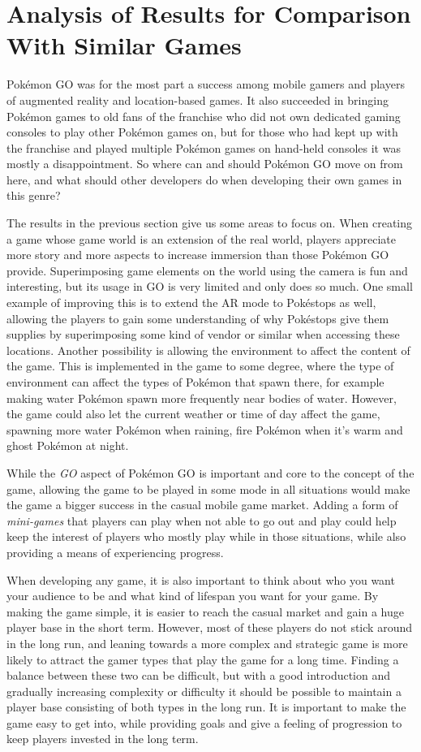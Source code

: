\section{Analysis of Results for Comparison With Similar Games}
Pokémon GO was for the most part a success among mobile gamers and players of augmented reality and location-based games. It also succeeded in bringing Pokémon games to old fans of the franchise who did not own dedicated gaming consoles to play other Pokémon games on, but for those who had kept up with the franchise and played multiple Pokémon games on hand-held consoles it was mostly a disappointment. So where can and should Pokémon GO move on from here, and what should other developers do when developing their own games in this genre?

The results in the previous section give us some areas to focus on. When creating a game whose game world is an extension of the real world, players appreciate more story and more aspects to increase immersion than those Pokémon GO provide. Superimposing game elements on the world using the camera is fun and interesting, but its usage in GO is very limited and only does so much. One small example of improving this is to extend the AR mode to Pokéstops as well, allowing the players to gain some understanding of why Pokéstops give them supplies by superimposing some kind of vendor or similar when accessing these locations. Another possibility is allowing the environment to affect the content of the game. This is implemented in the game to some degree, where the type of environment can affect the types of Pokémon that spawn there, for example making water Pokémon spawn more frequently near bodies of water. However, the game could also let the current weather or time of day affect the game, spawning more water Pokémon when raining, fire Pokémon when it's warm and ghost Pokémon at night.

While the \emph{GO} aspect of Pokémon GO is important and core to the concept of the game, allowing the game to be played in some mode in all situations would make the game a bigger success in the casual mobile game market. Adding a form of \emph{mini-games} that players can play when not able to go out and play could help keep the interest of players who mostly play while in those situations, while also providing a means of experiencing progress.

When developing any game, it is also important to think about who you want your audience to be and what kind of lifespan you want for your game. By making the game simple, it is easier to reach the casual market and gain a huge player base in the short term. However, most of these players do not stick around in the long run, and leaning towards a more complex and strategic game is more likely to attract the gamer types that play the game for a long time. Finding a balance between these two can be difficult, but with a good introduction and gradually increasing complexity or difficulty it should be possible to maintain a player base consisting of both types in the long run. It is important to make the game easy to get into, while providing goals and give a feeling of progression to keep players invested in the long term.

